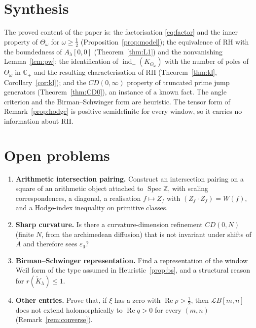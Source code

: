 \documentclass[11pt]{amsart}
\theoremstyle{definition}
\theoremstyle{remark}
\renewcommand{\Re}{\operatorname{Re}}
\newcommand{\half}{\tfrac{1}{2}}
\newcommand{\om}{\omega}
\newcommand{\eps}{\varepsilon}
\newcommand{\Spec}{\operatorname{Spec}}
\newcommand{\Z}{\mathbb{Z}}
\newcommand{\C}{\mathbb{C}}
\newcommand{\Th}{\Theta}
\newcommand{\indm}{\operatorname{ind}_-}
\begin{document}
\section{Synthesis}
The proved content of the paper is: the factorisation \eqref{eq:factor} and the inner property of
$\Th_\om$ for $\om\ge\half$ (Proposition~\ref{prop:model}); the equivalence of RH with the
boundedness of $A_\lambda[0,0]$ (Theorem~\ref{thm:L1}) and the nonvanishing
Lemma~\ref{lem:pw}; the identification of $\indm(K_{\Th_\om})$ with the number of poles of $\Th_\om$ in
$\C_+$ and the resulting characterisation of RH (Theorem~\ref{thm:kl}, Corollary~\ref{cor:kl}); and the
$CD(0,\infty)$ property of truncated prime jump generators (Theorem~\ref{thm:CD0}), an instance of a
known fact. The angle criterion and the Birman--Schwinger form are heuristic. The tensor form of
Remark~\ref{prop:hodge} is positive semidefinite for every
window, so it carries no information about RH.

\section{Open problems}
\begin{enumerate}[label=\textbf{Problem 9.\arabic*.}, leftmargin=*]
\item \textbf{Arithmetic intersection pairing.} Construct an intersection pairing on a square of an
arithmetic object attached to $\Spec\Z$, with scaling correspondences, a diagonal, a realisation
$f\mapsto Z_f$ with $(Z_f\cdot Z_f)=W(f)$, and a Hodge-index inequality on primitive classes.
\item \textbf{Sharp curvature.} Is there a curvature-dimension refinement $CD(0,N)$ (finite $N$, from
the archimedean diffusion) that is not invariant under shifts of $A$ and therefore sees $\eps_0$?
\item \textbf{Birman--Schwinger representation.} Find a representation of the window Weil form of
the type assumed in Heuristic~\ref{prop:bs}, and a structural reason for
$r(\tilde K_\lambda)\le1$.
\item \textbf{Other entries.} Prove that, if $\xi$ has a zero with $\Re\rho>\half$, then
$\mathcal LB[m,n]$ does not extend holomorphically to $\Re q>0$ for every $(m,n)$
(Remark~\ref{rem:converse}).
\end{enumerate}
\end{document}
